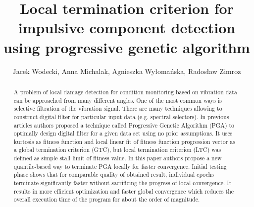 \documentclass{svproc}
\begin{document}
\mainmatter              %
%
\title{Local termination criterion for impulsive component detection using progressive genetic algorithm}
%
%
 \author{%
 Jacek Wodecki,  Anna Michalak, Agnieszka Wy{\l}oma{\'n}ska,  Rados{\l}aw Zimroz
}%
%
%
%



\maketitle              %

\begin{abstract}
A problem of local damage detection for condition monitoring based on vibration data can be approached from many different angles. One of the most common ways is selective filtration of the vibration signal. There are many techniques allowing to construct digital filter for particular input data (e.g. spectral selectors). In previous articles authors proposed a technique called Progressive Genetic Algorithm (PGA) to optimally design digital filter for a given data set using no prior assumptions. It uses kurtosis as fitness function and local linear fit of fitness function progression vector as a global termination criterion (GTC), but local termination criterion (LTC) was defined as simple stall limit of fitness value. In this paper authors propose a new quantile-based way to terminate PGA locally for faster convergence. Initial testing phase shows that for comparable quality of obtained result, individual epochs terminate significantly faster without sacrificing the progress of local convergence. It results in more efficient optimization and faster global convergence which reduces the overall execution time of the program for about the order of magnitude.
\end{abstract}
%
\end{document}
